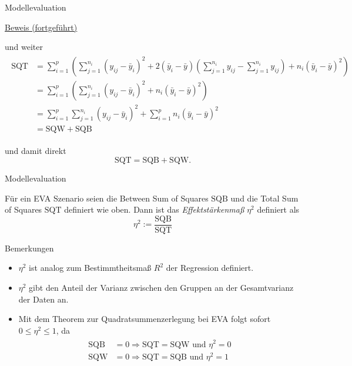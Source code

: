 \documentclass[
  8pt,
  ignorenonframetext,
]{beamer}
\providecommand{\tightlist}{%
  \setlength{\itemsep}{0pt}\setlength{\parskip}{0pt}}
\begin{document}
\begin{frame}{Modellevaluation}
\protect\hypertarget{modellevaluation-4}{}
\footnotesize

\underline{Beweis (fortgeführt)}

und weiter \tiny \begin{align}
\begin{split}
\mbox{SQT}
& =\sum_{i=1}^p \left(\sum_{j=1}^{n_i} (y_{ij}-\bar{y}_i)^2
                                       +2(\bar{y}_i-\bar{y})\left(\sum_{j=1}^{n_i} y_{ij}-\sum_{j=1}^{n_i}{y_{ij}}\right)
                                        +n_i(\bar{y}_i-\bar{y})^2 \right) \\
& =\sum_{i=1}^p \left(\sum_{j=1}^{n_i} (y_{ij}-\bar{y}_i)^2 +n_i(\bar{y}_i-\bar{y})^2 \right)
\\
& =\sum_{i=1}^p \sum_{j=1}^{n_i} (y_{ij}-\bar{y}_i)^2  + \sum_{i=1}^p n_i(\bar{y}_i-\bar{y})^2
\\
& = \mbox{SQW} + \mbox{SQB}
\end{split}
\end{align} \footnotesize

und damit direkt \begin{equation}
\mbox{SQT}  = \mbox{SQB} + \mbox{SQW}.
\end{equation}
\end{frame}

\begin{frame}{Modellevaluation}
\protect\hypertarget{modellevaluation-5}{}
\footnotesize

\begin{definition}
\justifying
Für ein EVA Szenario seien die Between Sum of Squares $\mbox{SQB}$ und die
Total Sum of Squares $\mbox{SQT}$ definiert wie oben. Dann ist das \textit{Effektstärkenmaß}
$\eta^2$ definiert als
\begin{equation}
\eta^2 := \frac{\mbox{SQB}}{\mbox{SQT}}
\end{equation}
\end{definition}
\vspace{-1mm}

Bemerkungen

\begin{itemize}
\tightlist
\item
  \(\eta^2\) ist analog zum Bestimmtheitsmaß \(R^2\) der Regression
  definiert.
\item
  \(\eta^2\) gibt den Anteil der Varianz zwischen den Gruppen an der
  Gesamtvarianz der Daten an.
\item
  Mit dem Theorem zur Quadratsummenzerlegung bei EVA folgt sofort
  \(0 \le \eta^2 \le 1\), da \begin{align}
  \begin{split}
  \mbox{SQB} & = 0 \Rightarrow \mbox{SQT} = \mbox{SQW und } \eta^2 = 0 \\
  \mbox{SQW} & = 0 \Rightarrow \mbox{SQT} = \mbox{SQB und } \eta^2 = 1
  \end{split}
  \end{align}
\end{itemize}
\end{frame}
\end{document}
